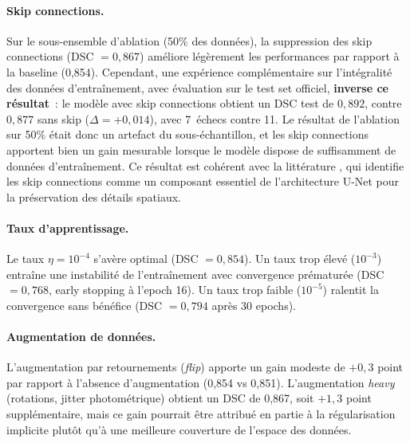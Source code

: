 \documentclass[12pt,a4paper]{article}
\begin{document}
\paragraph{Skip connections.} Sur le sous-ensemble d'ablation (50\% des données), la suppression des skip connections (DSC $= 0{,}867$) améliore légèrement les performances par rapport à la baseline (0,854). Cependant, une expérience complémentaire sur l'intégralité des données d'entraînement, avec évaluation sur le test set officiel, \textbf{inverse ce résultat}~: le modèle avec skip connections obtient un DSC test de $0{,}892$, contre $0{,}877$ sans skip ($\Delta = +0{,}014$), avec 7~échecs contre 11. Le résultat de l'ablation sur 50\% était donc un artefact du sous-échantillon, et les skip connections apportent bien un gain mesurable lorsque le modèle dispose de suffisamment de données d'entraînement. Ce résultat est cohérent avec la littérature \citep{ronneberger2015unet}, qui identifie les skip connections comme un composant essentiel de l'architecture U-Net pour la préservation des détails spatiaux.

\paragraph{Taux d'apprentissage.} Le taux $\eta = 10^{-4}$ s'avère optimal (DSC $= 0{,}854$). Un taux trop élevé ($10^{-3}$) entraîne une instabilité de l'entraînement avec convergence prématurée (DSC $= 0{,}768$, early stopping à l'epoch 16). Un taux trop faible ($10^{-5}$) ralentit la convergence sans bénéfice (DSC $= 0{,}794$ après 30 epochs).

\paragraph{Augmentation de données.} L'augmentation par retournements (\emph{flip}) apporte un gain modeste de $+0{,}3$ point par rapport à l'absence d'augmentation (0,854 vs 0,851). L'augmentation \emph{heavy} (rotations, jitter photométrique) obtient un DSC de 0,867, soit $+1{,}3$ point supplémentaire, mais ce gain pourrait être attribué en partie à la régularisation implicite plutôt qu'à une meilleure couverture de l'espace des données.
\end{document}
